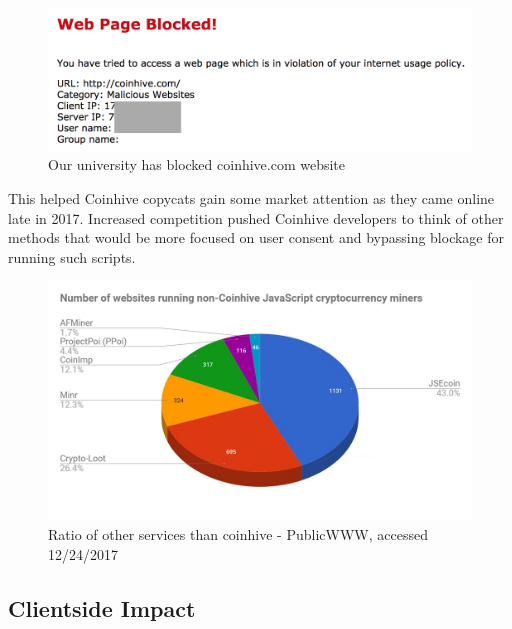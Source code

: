 \begin{figure}[t]
\centering
\includegraphics[width=\linewidth]{figures/coinhive_blocked.png}
\caption{Our university has blocked coinhive.com website}
\end{figure}


This helped Coinhive copycats gain some market attention as they came online late in 2017.
Increased competition pushed Coinhive developers to think of other methods that would be more focused on user consent and bypassing blockage for running such scripts.

\begin{figure}[t]
\centering
\includegraphics[width=\linewidth]{figures/non-coinhive-miners.png}
\caption{Ratio of other services than coinhive - PublicWWW, accessed 12/24/2017}
\end{figure}



\subsection{Clientside Impact}

